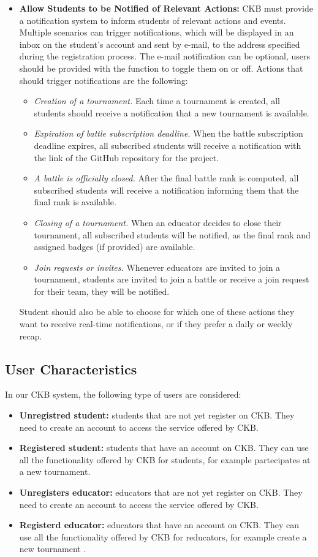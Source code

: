 \documentclass[a4paper, 11pt, titlepage]{article}
\begin{document}
\begin{itemize}
    \item \textbf{Allow Students to be Notified of Relevant Actions:} CKB must provide a notification system to inform students of relevant actions and events. Multiple scenarios 
    can trigger notifications, which will be displayed in an inbox on the student's account and sent by e-mail, to the address specified during the registration process. The e-mail notification can be optional, users
    should be provided with the function to toggle them on or off. Actions that should trigger notifications are the following:
    \begin{itemize}
        \item \textit{Creation of a tournament.} Each time a tournament is created, all students should receive a notification that a new tournament is available.
        \item \textit{Expiration of battle subscription deadline.} When the battle subscription deadline expires, all subscribed students will receive a notification with the link of the GitHub repository for the project.
        \item \textit{A battle is officially closed.} After the final battle rank is computed, all subscribed students will receive a notification informing them that the final rank is available.
        \item \textit{Closing of a tournament.} When an educator decides to close their tournament, all subscribed students will be notified, as the final rank and assigned badges (if provided) are available.
        \item \textit{Join requests or invites.} Whenever educators are invited to join a tournament, students are invited to join a battle or receive a join request for their team, they will be notified.
    \end{itemize}
    Student should also be able to choose for which one of these actions they want to receive real-time notifications, or if they prefer a daily or weekly recap. 
    
\end{itemize}
\subsection{User Characteristics}
In our CKB system, the following type of users are considered:
\begin{itemize}
    \item \textbf{Unregistred student:} students that are not yet register on CKB. They need to create an account to access the service offered by CKB.
    \item \textbf{Registered student:} students that have an account on CKB. They can use all the functionality offered by CKB for students, for example partecipates at a new tournament.
    \item \textbf{Unregisters educator:} educators that are not yet register on CKB. They need to create an account to access the service offered by CKB.
    \item \textbf{Registerd educator:} educators that have an account on CKB. They can use all the functionality offered by CKB for reducators, for example create a new tournament .
\end{itemize}
\end{document}
